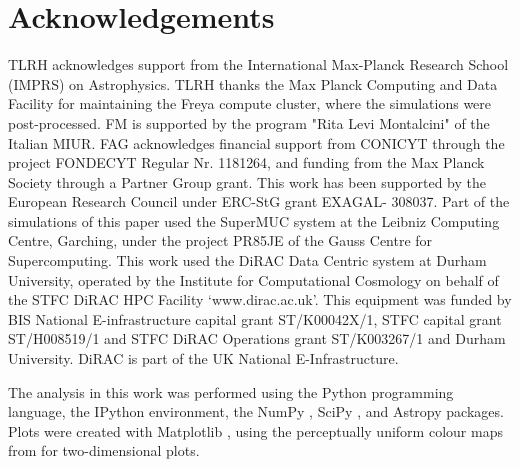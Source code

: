 \documentclass[a4paper,fleqn,usenatbib]{mnras}
\begin{document}
\section*{Acknowledgements}
TLRH acknowledges support from the International Max-Planck Research School (IMPRS)
on Astrophysics. TLRH thanks the Max Planck Computing and Data Facility for
maintaining the Freya compute cluster, where the simulations were post-processed.
FM is supported by the program "Rita Levi Montalcini" of the Italian MIUR. FAG 
acknowledges financial support from CONICYT through the project FONDECYT Regular 
Nr. 1181264, and funding from the Max Planck Society through a Partner Group grant.
This work has been supported by the European Research Council under ERC-StG grant
EXAGAL- 308037. Part of the simulations of this paper used the SuperMUC system 
at the Leibniz Computing Centre, Garching, under the project PR85JE of the Gauss 
Centre for Supercomputing. This work used the DiRAC Data Centric system at Durham
University, operated by the Institute for Computational Cosmology on behalf of
the STFC DiRAC HPC Facility `www.dirac.ac.uk'. This equipment was funded by BIS 
National E-infrastructure capital grant ST/K00042X/1, STFC capital grant 
ST/H008519/1 and STFC DiRAC Operations grant ST/K003267/1 and Durham University.
DiRAC is part of the UK National E-Infrastructure.


The analysis in this work was performed using the Python \citep{python}
programming language, the IPython \citep{2007CSE.....9c..21P} environment, 
the NumPy \citep{2011CSE....13b..22V}, SciPy \citep{scipy}, and Astropy 
\citep{2013A&A...558A..33A} packages. Plots were created with Matplotlib 
\citep{2007CSE.....9...90H}, using the perceptually uniform colour maps
from \citet{2015arXiv150903700K} for two-dimensional plots.







 


\end{document}
